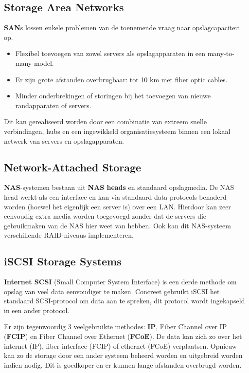 \subsection{Storage Area Networks}
\textbf{SAN}s lossen enkele problemen van de toenemende vraag naar opslagcapaciteit op. 
\begin{itemize}
	\item Flexibel toevoegen van zowel servers als opslagapparaten in een many-to-many model.
	\item Er zijn grote afstanden overbrugbaar: tot 10 km met fiber optic cables.
	\item Minder onderbrekingen of storingen bij het toevoegen van nieuwe randapparaten of servers.
\end{itemize}
Dit kan gerealiseerd worden door een combinatie van extreem snelle verbindingen, hubs en een ingewikkeld organisatiesysteem binnen een lokaal netwerk van servers en opslagapparaten. 


\subsection{Network-Attached Storage}
\textbf{NAS}-systemen bestaan uit \textbf{NAS heads} en standaard opslagmedia. De NAS head werkt als een interface en kan via standaard data protocols benaderd worden (hoewel het eigenlijk een server is) over een LAN. Hierdoor kan zeer eenvoudig extra media worden toegevoegd zonder dat de servers die gebruikmaken van de NAS hier weet van hebben. Ook kan dit NAS-systeem verschillende RAID-niveaus implementeren.

\subsection{iSCSI Storage Systems}
\textbf{Internet SCSI} (Small Computer System Interface) is een derde methode om opslag van veel data eenvoudiger te maken. Concreet gebruikt iSCSI het standaard SCSI-protocol om data aan te spreken, dit protocol wordt ingekapseld in een ander protocol.

Er zijn tegenwoordig 3 veelgebruikte methodes: \textbf{IP}, Fiber Channel over IP (\textbf{FCIP}) en Fiber Channel over Ethernet (\textbf{FCoE}). De data kan zich zo over het internet (IP), fiber interface (FCIP) of ethernet (FCoE) verplaatsen. Opnieuw kan zo de storage door een ander systeem beheerd worden en uitgebreid worden indien nodig. Dit is goedkoper en er kunnen lange afstanden overbrugd worden.